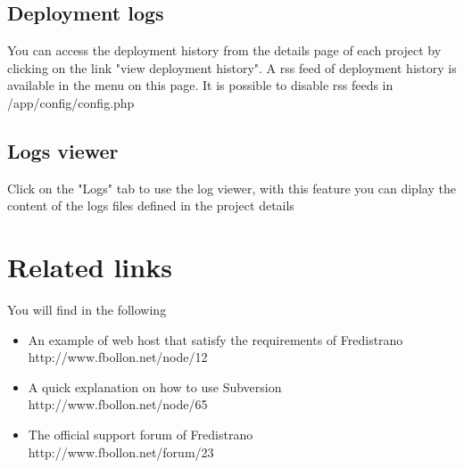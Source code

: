 \documentclass[12pt,a4paper]{report}
\begin{document}
\section{Deployment logs}
You can access the deployment history from the details page of each project by clicking on the link "view deployment history". A rss feed of deployment history is available in the menu on this page. It is possible to disable rss feeds in /app/config/config.php 

\section{Logs viewer}
Click on the "Logs" tab to use the log viewer, with this feature you can diplay the content of the logs files defined in the project details
\chapter{Related links}
You will find in the following 
\begin{itemize}
\item An example of web host that satisfy the requirements of Fredistrano \\ http://www.fbollon.net/node/12 \\
\item A quick explanation on how to use Subversion \\ http://www.fbollon.net/node/65 \\
\item The official support forum of Fredistrano \\ http://www.fbollon.net/forum/23
\end{itemize}
\end{document}
